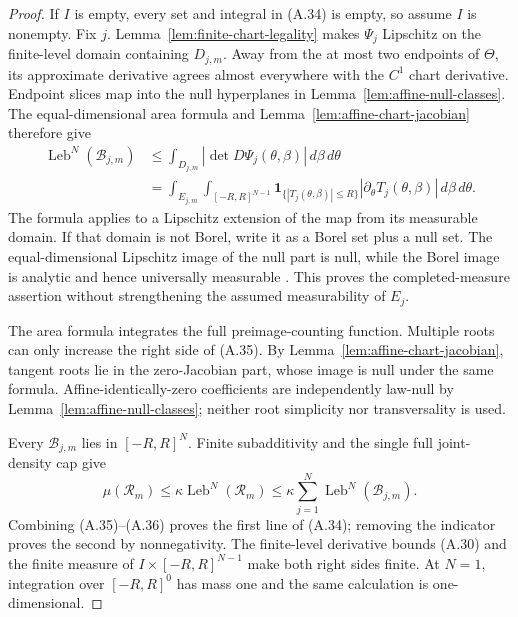 \begin{proof}
If $I$ is empty, every set and integral in (A.34) is empty, so assume $I$ is
nonempty.  Fix $j$.  Lemma~\ref{lem:finite-chart-legality} makes $\Psi_j$
Lipschitz on the finite-level domain containing $D_{j,m}$.  Away from the at
most two endpoints of $\Theta$, its approximate derivative agrees almost
everywhere with the $C^1$ chart derivative.  Endpoint slices map into the
null hyperplanes in Lemma~\ref{lem:affine-null-classes}.  The
equal-dimensional area formula \citep{federer1969gmt} and
Lemma~\ref{lem:affine-chart-jacobian} therefore give
\[
\begin{aligned}
\operatorname{Leb}^N(\mathcal B_{j,m})
&\leq\int_{D_{j,m}}
 |\det D\Psi_j(\theta,\beta)|\,d\beta\,d\theta\\
&=\int_{E_{j,m}}\int_{[-R,R]^{N-1}}
 \mathbf1_{\{|T_j(\theta,\beta)|\leq R\}}
 |\partial_\theta T_j(\theta,\beta)|
 \,d\beta\,d\theta.
\end{aligned}
\tag{A.35}
\]
The formula applies to a Lipschitz extension of the map from its measurable
domain.  If that domain is not Borel, write it as a Borel set plus a null set.
The equal-dimensional Lipschitz image of the null part is null, while the
Borel image is analytic and hence universally measurable
\citep{bogachev2007measure}.  This proves the completed-measure assertion
without strengthening the assumed measurability of $E_j$.

The area formula integrates the full preimage-counting function.  Multiple
roots can only increase the right side of (A.35).  By
Lemma~\ref{lem:affine-chart-jacobian}, tangent roots lie in the zero-Jacobian
part, whose image is null under the same formula.  Affine-identically-zero
coefficients are independently law-null by
Lemma~\ref{lem:affine-null-classes}; neither root simplicity nor
transversality is used.

Every $\mathcal B_{j,m}$ lies in $[-R,R]^N$.  Finite subadditivity and the
single full joint-density cap give
\[
\mu(\mathcal R_m)
\leq\kappa\operatorname{Leb}^N(\mathcal R_m)
\leq\kappa\sum_{j=1}^N\operatorname{Leb}^N(\mathcal B_{j,m}).
\tag{A.36}
\]
Combining (A.35)--(A.36) proves the first line of (A.34); removing the
indicator proves the second by nonnegativity.  The finite-level derivative
bounds (A.30) and the finite measure of
$I\times[-R,R]^{N-1}$ make both right sides finite.  At $N=1$, integration
over $[-R,R]^0$ has mass one and the same calculation is one-dimensional.
\end{proof}

